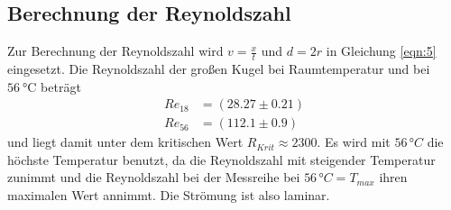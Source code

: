 \subsection{Berechnung der Reynoldszahl}
Zur Berechnung der Reynoldszahl wird $v = \frac{x}{t}$ \: und \: $d = 2r$ in Gleichung \eqref{eqn:5} eingesetzt.
Die Reynoldszahl der großen Kugel bei Raumtemperatur und bei $\SI{56}{\degreeCelsius}$ beträgt
\begin{align*}
  Re_{18} &= (28.27 \pm 0.21)\\
  Re_{56} &= (112.1 \pm 0.9)
\end{align*} und liegt damit unter dem kritischen Wert $R_{Krit} \approx 2300$\;\;\cite{reynold_kritisch}. Es wird mit $56\,\unit{°C}$ die höchste Temperatur benutzt, da 
die Reynoldszahl mit steigender Temperatur zunimmt und die Reynoldszahl bei der Messreihe bei $56\,\unit{°C} = T_{max}$ ihren maximalen Wert annimmt.
Die Strömung ist also laminar.\\

\newpage
